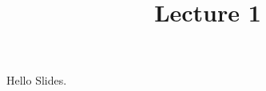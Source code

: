 \documentclass{beamer}
\title{Lecture 1}
\begin{document}
\begin{frame}{Hello}
Slides.
\end{frame}
\end{document}
